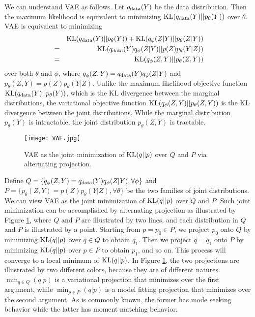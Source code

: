 \documentclass{article}
\def\KL{{\rm KL}}
\begin{document}
We can understand VAE as follows. Let $q_{\rm data}(Y)$ be the data distribution. Then the maximum likelihood is equivalent to minimizing ${\rm KL}(q_{\rm data}(Y)||p_\theta(Y))$ over $\theta$. VAE is equivalent to minimizing
\begin{eqnarray}
\label{eqn5}
&&{\rm KL}(q_{\rm data}(Y)||p_\theta(Y)) + {\rm KL}(q_\phi(Z|Y)||p_\theta(Z|Y)) \nonumber \\
&=& {\rm KL}(q_{\rm data}(Y) q_\phi(Z|Y)||p(Z) p_\theta(Y|Z)) \\
&=&  {\rm KL}(q_\phi(Z, Y)||p_\theta(Z, Y))
\end{eqnarray}
over both $\theta$ and $\phi$, where $q_\phi(Z, Y) = q_{\rm data}(Y) q_\phi(Z|Y)$ and $p_\theta(Z, Y) =  p(Z) p_\theta(Y|Z)$.  Unlike the maximum likelihood objective function ${\rm KL}(q_{\rm data}(Y)||p_\theta(Y))$, which is the KL divergence between the marginal distributions, the variational objective function   ${\rm KL}(q_\phi(Z, Y)||p_\theta(Z, Y))$  is the KL divergence between the joint distributions. While the marginal distribution $p_\theta(Y)$ is intractable, the joint distribution $p_\theta(Z, Y)$ is tractable.
\begin{figure}[h]
\begin{center}
\texttt{[image: VAE.jpg]}
\caption{VAE as the joint minimization of $\KL(q||p)$ over $Q$ and $P$ via alternating projection. }
\label{fig:VAE}
\end{center}
\end{figure}

Define $Q = \{ q_\phi(Z, Y) = q_{\rm data}(Y) q_\phi(Z|Y), \forall \phi\}$ and $P = \{ p_\theta(Z, Y) =  p(Z) p_\theta(Y|Z), \forall \theta\}$ be the two families of joint distributions. We can view VAE as the joint minimization of ${\rm KL}(q||p)$ over $Q$ and $P$. Such joint minimization can be accomplished by alternating projection as illustrated by Figure \ref{fig:VAE}, where $Q$ and $P$ are illustrated by two lines, and each distribution in $Q$ and $P$ is illustrated by a point. Starting from $p = p_0 \in P$, we project $p_0$ onto $Q$ by minimizing ${\rm KL}(q||p)$ over $q \in Q$ to obtain $q_1$. Then we project $q = q_1$ onto $P$ by minimizing ${\rm KL}(q||p)$ over $p \in P$ to obtain $p_1$, and so on. This process will converge to a local minimum of ${\rm KL}(q||p)$.
In Figure \ref{fig:VAE}, the two projections are illustrated by two different colors, because they are of different natures. $\min_{q\in Q}(q|p)$ is a variational projection that minimizes over the first argument, while  $\min_{p \in P}(q|p)$ is a model fitting projection that minimizes over the second argument. As is commonly known, the former has mode seeking behavior while the latter has moment matching behavior.
\end{document}
